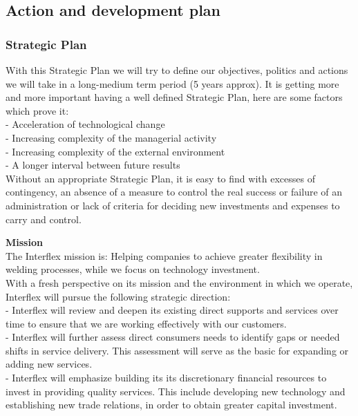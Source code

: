 \subsection{Action and development plan}
\subsubsection{Strategic Plan}

With this Strategic Plan we will try to define our objectives, politics and actions we will take in a long-medium term period (5 years approx). It is getting more and more important having a well defined Strategic Plan, here are some factors which prove it:\\
	- Acceleration of technological change\\
	- Increasing complexity of the managerial activity\\
	- Increasing complexity of the external environment\\
	- A longer interval between future results\\
Without an appropriate Strategic Plan, it is easy to find with excesses of contingency, an absence of a measure to control the real success or failure of an administration or lack of criteria for deciding new investments and expenses to carry and control.

\textbf{Mission}\\
The Interflex mission is:
Helping companies to achieve greater flexibility in welding processes, while we focus on technology investment.\\

With a fresh perspective on its mission and the environment in which we operate, Interflex will pursue the following strategic direction:\\
	- Interflex will review and deepen its existing direct supports and services over time to ensure that we are working effectively with our customers.\\
	- Interflex will further assess direct consumers needs to identify gaps or needed shifts in service delivery. This assessment will serve as the basic for expanding or adding new services.\\
	- Interflex will emphasize building its its discretionary financial resources to invest in providing quality services. This include developing new technology and establishing new trade relations, in order to obtain greater capital investment.


